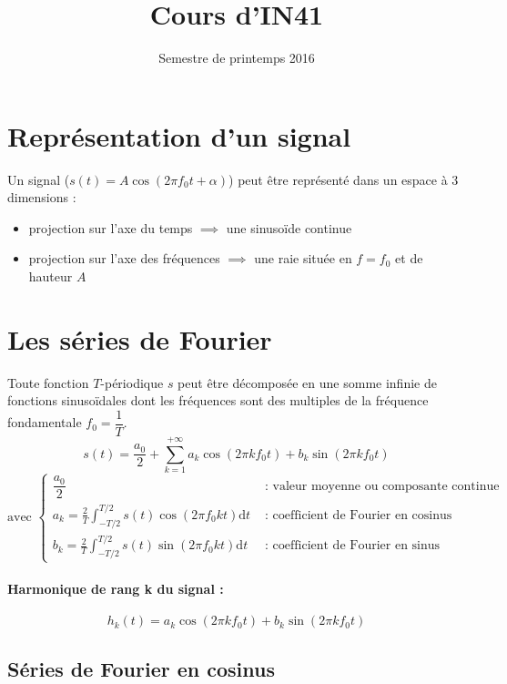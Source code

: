 \documentclass[a4paper,12pt]{article}
\title{Cours d'IN41}{Chapitre 2 -- Analyse des signaux périodiques}
\author{}
\date{Semestre de printemps 2016}
\begin{document}
\maketitlepage

\tableofcontents
\pagebreak

\section{Représentation d'un signal}

Un signal ($s(t) = A \cos(2\pi f_{0}t + \alpha)$) peut être représenté dans un espace à 3 dimensions :
\begin{itemize}
    \item projection sur l'axe du temps $\implies$ une sinusoïde continue
    \item projection sur l'axe des fréquences $\implies$ une raie située en $f = f_{0}$ et de hauteur $A$
\end{itemize}

\section{Les séries de Fourier}

\begin{defi}
    Toute fonction $T$-périodique $s$ peut être décomposée en une somme infinie de fonctions sinusoïdales dont les fréquences sont des multiples de la fréquence fondamentale $f_{0} = \dfrac{1}{T}$.
    \[ s(t) = \dfrac{a_{0}}{2} + \sum_{k=1}^{+\infty} a_{k} \cos(2\pi k f_{0} t) + b_{k} \sin(2\pi k f_{0} t) \]
    \[ \text{avec } \begin{cases}
        \dfrac{a_{0}}{2} & \text{ : valeur moyenne ou composante continue} \\
        a_{k} = \frac{2}{T} \int_ {-T/2}^{T/2} s(t) \cos(2\pi f_{0} kt) \mathrm{d}t & \text{ : coefficient de Fourier en cosinus} \\
        b_{k} = \frac{2}{T} \int_ {-T/2}^{T/2} s(t) \sin(2\pi f_{0} kt) \mathrm{d}t & \text{ : coefficient de Fourier en sinus}
    \end{cases} \]
\end{defi}

\paragraph{Harmonique de rang k du signal :}
\[ h_{k}(t) = a_{k} \cos(2\pi kf_{0}t) + b_{k} \sin(2\pi kf_{0}t) \]

\subsection{Séries de Fourier en cosinus}
\end{document}

